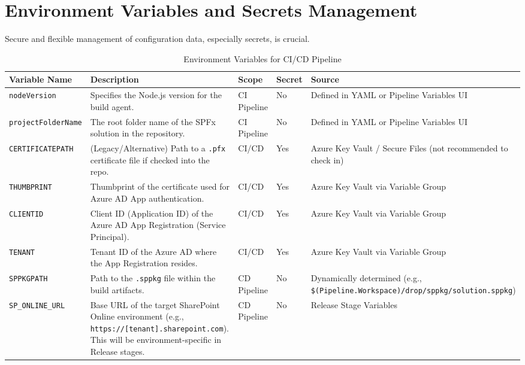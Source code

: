 \section{Environment Variables and Secrets Management}
\label{sec:EnvVariablesSecretsMgmt}

Secure and flexible management of configuration data, especially secrets, is crucial.

\begin{table}[htbp]
    \small
    \centering
    \caption{Environment Variables for CI/CD Pipeline}
    \label{tab:EnvVariablesCICD}
    \begin{tabularx}{\textwidth}{|l|X|l|l|X|}
        \hline
        \textbf{Variable Name} & \textbf{Description} & \textbf{Scope} & \textbf{Secret} & \textbf{Source} \\
        \hline
        \texttt{nodeVersion} & Specifies the Node.js version for the build agent. & CI Pipeline & No & Defined in YAML or Pipeline Variables UI \\
        \hline
        \texttt{projectFolderName} & The root folder name of the SPFx solution in the repository. & CI Pipeline & No & Defined in YAML or Pipeline Variables UI \\
        \hline
        \texttt{CERTIFICATEPATH} & (Legacy/Alternative) Path to a \texttt{.pfx} certificate file if checked into the repo. & CI/CD & Yes & Azure Key Vault / Secure Files (not recommended to check in) \\
        \hline
        \texttt{THUMBPRINT} & Thumbprint of the certificate used for Azure AD App authentication. & CI/CD & Yes & Azure Key Vault via Variable Group \\
        \hline
        \texttt{CLIENTID} & Client ID (Application ID) of the Azure AD App Registration (Service Principal). & CI/CD & Yes & Azure Key Vault via Variable Group \\
        \hline
        \texttt{TENANT} & Tenant ID of the Azure AD where the App Registration resides. & CI/CD & Yes & Azure Key Vault via Variable Group \\
        \hline
        \texttt{SPPKGPATH} & Path to the \texttt{.sppkg} file within the build artifacts. & CD Pipeline & No & Dynamically determined (e.g., \texttt{\$(Pipeline.Workspace)/drop/sppkg/solution.sppkg}) \\
        \hline
        \texttt{SP\_ONLINE\_URL} & Base URL of the target SharePoint Online environment (e.g., \texttt{https://[tenant].sharepoint.com}). This will be environment-specific in Release stages. & CD Pipeline & No & Release Stage Variables \\

\end{tabularx}
\end{table}
